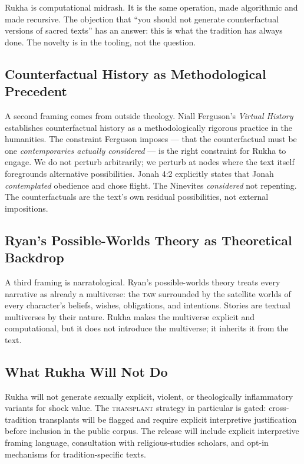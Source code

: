 \documentclass[11pt]{article}
\theoremstyle{rukha}
\begin{document}
Rukha is computational midrash. It is the same operation, made
algorithmic and made recursive. The objection that ``you should not
generate counterfactual versions of sacred texts'' has an answer: this
is what the tradition has always done. The novelty is in the tooling,
not the question.

\subsection{Counterfactual History as Methodological Precedent}

A second framing comes from outside theology. Niall Ferguson's
\emph{Virtual History} \cite{virtualhistory} establishes counterfactual
history as a methodologically rigorous practice in the humanities. The
constraint Ferguson imposes --- that the counterfactual must be one
\emph{contemporaries actually considered} --- is the right constraint for
Rukha to engage. We do not perturb arbitrarily; we perturb at
nodes where the text itself foregrounds alternative possibilities. Jonah
4:2 explicitly states that Jonah \emph{contemplated} obedience and chose
flight. The Ninevites \emph{considered} not repenting. The
counterfactuals are the text's own residual possibilities, not external
impositions.

\subsection{Ryan's Possible-Worlds Theory as Theoretical Backdrop}

A third framing is narratological. Ryan's possible-worlds theory
\cite{ryan} treats every narrative as already a multiverse: the
\textsc{taw} surrounded by the satellite worlds of every character's
beliefs, wishes, obligations, and intentions. Stories are textual
multiverses by their nature. Rukha makes the multiverse explicit and
computational, but it does not introduce the multiverse; it inherits it
from the text.

\subsection{What Rukha Will Not Do}

Rukha will not generate sexually explicit, violent, or theologically
inflammatory variants for shock value. The \textsc{transplant}
strategy in particular is gated: cross-tradition transplants will be
flagged and require explicit interpretive justification before
inclusion in the public corpus. The release will include explicit
interpretive framing language, consultation with religious-studies
scholars, and opt-in mechanisms for tradition-specific texts.
\end{document}
